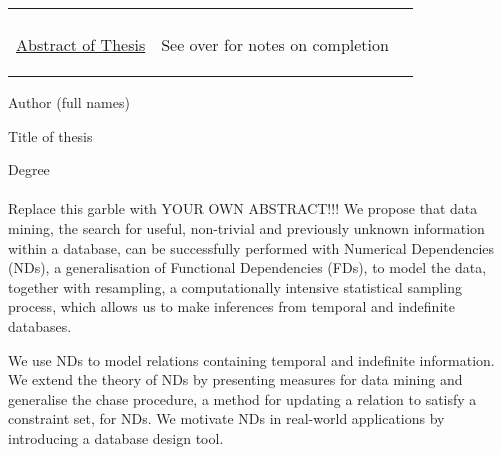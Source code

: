 \documentclass[12pt]{article}
\begin{document}
\pagestyle{empty}

\begin{table}[ht]
\begin{center}
\begin{tabular}{p{4em}p{27em}p{6em}} 
& \begin{center} {\bf UNIVERSITY OF LONDON} \\ {\underline{Abstract of Thesis}}
\end{center}  & \begin{flushright} See over for notes on completion 
\end{flushright} \\ 
\end{tabular}
\end{center}
\end{table}

\hfill \raisebox{-2ex}{YOUR NAME HERE} \hfill\hfill

Author (full names) \dotfill 

\hfill \raisebox{-2.3ex}{Title here } \hfill\hfill

Title of thesis \dotfill 

\hfill\hfill \raisebox{-2.3ex}{title (continued) } \hfill\hfill\hfill\hfill\hfill

\dotfill 

\hfill\hfill\hfill \raisebox{-2.3ex}{Ph.D } \hfill

\dotfill \dotfill Degree \dotfill \\

\hrulefill \\

 
Replace this garble with YOUR OWN ABSTRACT!!!
We propose that data mining, the search for useful,
non-trivial and previously unknown information within a database,
can be successfully performed with Numerical Dependencies (NDs), a
generalisation of Functional Dependencies (FDs), to model the data,
together with resampling, a computationally intensive statistical
sampling process, which allows us to make inferences from temporal
and indefinite databases.

\medskip

We use NDs to model relations containing
temporal and indefinite information. We extend the theory of NDs
by presenting measures for data mining and generalise the chase
procedure, a method for updating a relation to satisfy a constraint
set, for NDs. We motivate NDs in real-world applications by introducing
a database design tool.

\medskip
\end{document}
